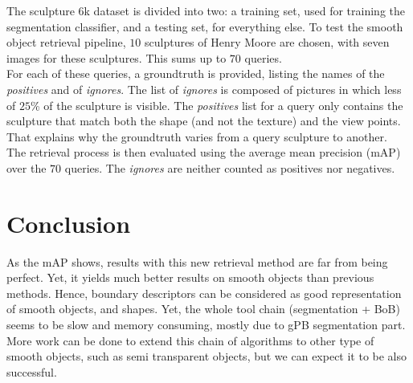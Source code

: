 \documentclass{article}
\begin{document}
The sculpture 6k dataset is divided into two: a training set, used for
training the segmentation classifier, and a testing set, for everything else.
To test the smooth object retrieval pipeline, $10$ sculptures of Henry Moore are
chosen, with seven images for these sculptures. This sums up to $70$ queries. \\
For each of these queries, a groundtruth is provided, listing the names of the
\textit{positives} and of \textit{ignores}. The list of \textit{ignores} is
composed of pictures in which less of $25$\% of the sculpture is visible. The
\textit{positives} list for a query only contains the sculpture that match
both the shape (and not the texture) and the view points. That explains why
the groundtruth varies from a query sculpture to another. \\
The retrieval process is then evaluated using the average mean precision (mAP)
over the $70$ queries. The \textit{ignores} are neither counted as positives nor
negatives.


\section{Conclusion}

As the mAP shows, results with this new retrieval method are far from being
perfect. Yet, it yields much better results on smooth objects than previous
methods. Hence, boundary descriptors can be considered as good representation
of smooth objects, and shapes. Yet, the whole tool chain (segmentation + BoB)
seems to be slow and memory consuming, mostly due to gPB segmentation part. \\
More work can be done to extend this chain of algorithms to other type of
smooth objects, such as semi transparent objects, but we can expect it to be
also successful. \\



\end{document}
